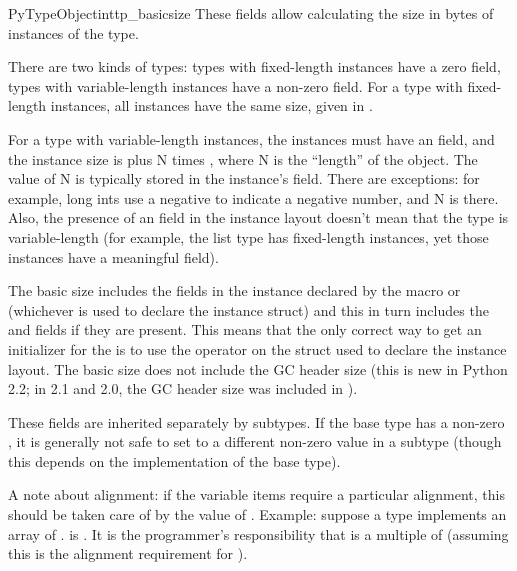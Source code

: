 \begin{cmemberdesc}{PyTypeObject}{int}{tp_basicsize}
  These fields allow calculating the size in bytes of instances of
  the type.

  There are two kinds of types: types with fixed-length instances have
  a zero  field, types with variable-length
  instances have a non-zero  field.  For a type
  with fixed-length instances, all instances have the same size,
  given in .

  For a type with variable-length instances, the instances must have
  an  field, and the instance size is
   plus N times , where N is
  the ``length'' of the object.  The value of N is typically stored in
  the instance's  field.  There are exceptions:  for
  example, long ints use a negative  to indicate a
  negative number, and N is  there.  Also,
  the presence of an  field in the instance layout
  doesn't mean that the type is variable-length (for example, the list
  type has fixed-length instances, yet those instances have a
  meaningful  field).

  The basic size includes the fields in the instance declared by the
  macro  or
   (whichever is used to declare the
  instance struct) and this in turn includes the  and
   fields if they are present.  This means that the
  only correct way to get an initializer for the 
  is to use the  operator on the struct used to
  declare the instance layout.  The basic size does not include the GC
  header size (this is new in Python 2.2; in 2.1 and 2.0, the GC
  header size was included in ).

  These fields are inherited separately by subtypes.  If the base type
  has a non-zero , it is generally not safe to set
   to a different non-zero value in a subtype
  (though this depends on the implementation of the base type).

  A note about alignment: if the variable items require a particular
  alignment, this should be taken care of by the value of
  .  Example: suppose a type implements an array
  of .  is .
  It is the programmer's responsibility that  is
  a multiple of  (assuming this is the alignment
  requirement for ).
\end{cmemberdesc}

